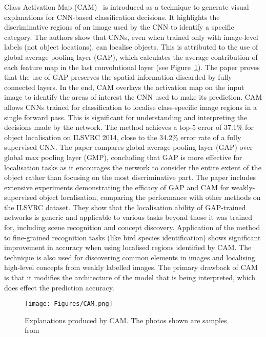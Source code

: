 Class Activation Map (CAM)~\cite{ZhouKLOT16} is introduced as a technique to generate visual explanations for CNN-based classification decisions. It highlights the discriminative regions of an image used by the CNN to identify a specific category. The authors show that CNNs, even when trained only with image-level labels (not object locations), can localise objects. This is attributed to the use of global average pooling layer (GAP), which calculates the average contribution of each feature map in the last convolutional layer (see Figure~\ref{Fig:CAM}). The paper proves that the use of GAP preserves the spatial information discarded by fully-connected layers. In the end, CAM overlays the activation map on the input image to identify the areas of interest the CNN used to make its prediction. CAM allows CNNs trained for classification to localise class-specific image regions in a single forward pass. This is significant for understanding and interpreting the decisions made by the network. The method achieves a top-5 error of 37.1\% for object localisation on ILSVRC 2014, close to the 34.2\% error rate of a fully supervised CNN. The paper compares global average pooling layer (GAP) over global max pooling layer (GMP), concluding that GAP is more effective for localisation tasks as it encourages the network to consider the entire extent of the object rather than focusing on the most discriminative part. The paper includes extensive experiments demonstrating the efficacy of GAP and CAM for weakly-supervised object localisation, comparing the performance with other methods on the ILSVRC dataset. They show that the localisation ability of GAP-trained networks is generic and applicable to various tasks beyond those it was trained for, including scene recognition and concept discovery. Application of the method to fine-grained recognition tasks (like bird species identification) shows significant improvement in accuracy when using localised regions identified by CAM. The technique is also used for discovering common elements in images and localising high-level concepts from weakly labelled images. The primary drawback of CAM is that it modifies the architecture of the model that is being interpreted, which does effect the prediction accuracy.

\begin{figure}[ht!]
	\begin{center}
	\texttt{[image: Figures/CAM.png]}
	\end{center}
	\caption{Explanations produced by CAM. The photos shown are samples from~\cite{ZhouKLOT16}}
	\label{Fig:CAM}
\end{figure} 

